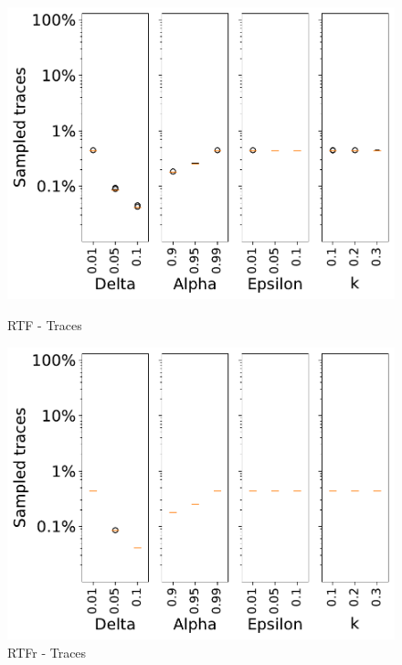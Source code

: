 \documentclass[landscape]{article}
\begin{document}
\begin{figure}[!htb]
\begin{minipage}{0.2\textwidth}
		\includegraphics[width=1.0\textwidth]{../Road_Traffic_Fines_Management_Process/Road_Traffic_Fines_Management_Process_param_traces_Approx_k02.pdf}
		\caption{RTF - Traces}
	\end{minipage}
	\hfill
	\begin{minipage}{0.2\textwidth}
		\includegraphics[width=1.0\textwidth]{../RTFM_model2/RTFM_model2_param_traces_Approx_k02.pdf}
		\caption{RTFr - Traces}
	\end{minipage}
\end{figure}
\vspace{-0.5cm}
\end{document}
